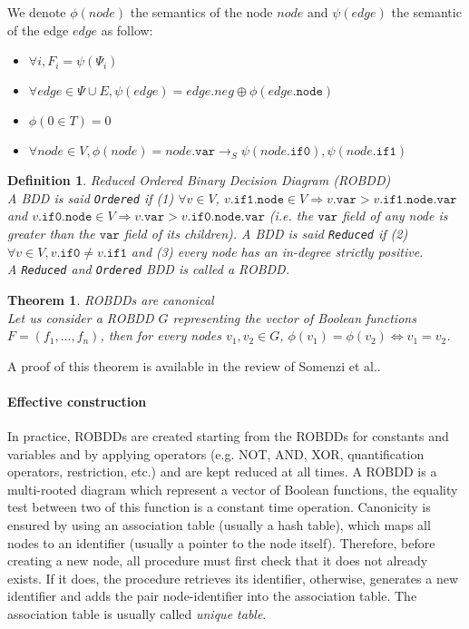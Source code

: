 \documentclass[a4paper,10pt]{article}
\newcommand{\shannon}[3]{{#1}\longrightarrow_S{#2}, {#3}}
\newcommand{\fieldVar}{\texttt{var}}
\newcommand{\fieldNode}{\texttt{node}}
\newcommand{\fieldThen}{\mathtt{if1}}
\newcommand{\fieldElse}{\mathtt{if0}}
\newtheorem{newtheo}{Theorem}
\newcommand{\theorem}[2]{\begin{newtheo}{\textsf{#1}\\} #2 \end{newtheo}}
\newtheorem{newdef}{Definition}
\newcommand{\definition}[2]{\begin{newdef}{#1\\}#2\end{newdef}}
\begin{document}

We denote $\phi(node)$ the semantics of the node $node$ and $\psi(edge)$ the semantic of the edge $edge$ as follow: \begin{itemize}
\item $\forall i, F_i = \psi(\Psi_i)$
\item $\forall edge \in \Psi \cup E, \psi(edge) = edge.neg \oplus \phi(edge.\fieldNode{})$
\item $\phi(0 \in T) = 0$
\item $\forall node \in V, \phi(node) = \shannon{node.\fieldVar{}}{\psi(node.\fieldElse{})}{\psi(node.\fieldThen{})}$
\end{itemize}

\definition{Reduced Ordered Binary Decision Diagram (ROBDD)}
{
A BDD is said \texttt{Ordered} if (1) $\forall v\in V$, $v.\fieldThen{}.\fieldNode{}\in V \Rightarrow v.\fieldVar{}> v.\fieldThen{}.\fieldNode{}.\fieldVar{}$ and $v.\fieldElse{}.\fieldNode{}\in V \Rightarrow v.\fieldVar{}> v.\fieldElse{}.\fieldNode{}.\fieldVar{}$ (i.e. the $\fieldVar{}$ field of any node is greater than the $\fieldVar{}$ field of its children).
A BDD is said \texttt{Reduced} if (2) $\forall v\in V, v.\fieldElse{} \neq v.\fieldThen{}$ and (3) every node has an in-degree strictly positive.\\
A \texttt{Reduced} and \texttt{Ordered} BDD is called a ROBDD.
}

\theorem{ROBDDs are canonical}
{
Let us consider a ROBDD $G$ representing the vector of Boolean functions $F=(f_1, ..., f_n)$, then for every nodes $v_1, v_2 \in G$, $\phi(v_1) = \phi(v_2) \Leftrightarrow v_1 = v_2$.
}
A proof of this theorem is available in the review of Somenzi et al.\cite{Somenzi1999}.

\paragraph{Effective construction\\}
In practice, ROBDDs are created starting from the ROBDDs for constants and variables and by applying operators (e.g. NOT, AND, XOR, quantification operators, restriction, etc.) and are kept reduced at all times.
A ROBDD is a multi-rooted diagram which represent a vector of Boolean functions, the equality test between two of this function is a constant time operation.
Canonicity is ensured by using an association table (usually a hash table), which maps all nodes to an identifier (usually a pointer to the node itself).
Therefore, before creating a new node, all procedure must first check that it does not already exists. If it does, the procedure retrieves its identifier, otherwise, generates a new identifier and adds the pair node-identifier into the association table.
The association table is usually called \textit{unique table}.
\end{document}
